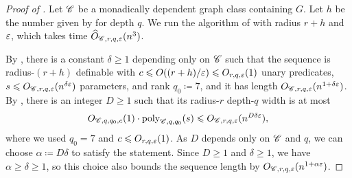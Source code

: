 \begin{proof}[Proof of ]
  Let $\mathscr C$ be a monadically dependent graph class containing $G$.
  Let $h$ be the number given by  for depth $q$.
  We run the algorithm of  with radius $r+h$ and $\varepsilon$, which takes time $\widehat O_{\mathscr C,r,q,\varepsilon}(n^3)$.
  
  By , there is a constant $\delta\ge1$ depending only on $\mathscr C$ such that the sequence is radius-$(r+h)$ definable with $c\leqslant O((r+h)/\varepsilon)\leqslant O_{r,q,\varepsilon}(1)$ unary predicates, $s\leqslant O_{\mathscr C,r,q,\varepsilon}(n^{\delta\varepsilon})$ parameters, and rank $q_0\coloneqq7$,
  and it has length $O_{\mathscr C,r,q,\varepsilon}(n^{1+\delta\varepsilon})$.
  By , there is an integer $D\ge1$ such that its radius-$r$ depth-$q$ width is at most
  \[
    O_{\mathscr C,q,q_0,c}(1)\cdot\mathrm{poly}_{\mathscr C,q,q_0}(s)\leqslant O_{\mathscr C,r,q,\varepsilon}(n^{D\delta\varepsilon}),
  \]
  where we used $q_0=7$ and $c\leqslant O_{r,q,\varepsilon}(1)$. As $D$ depends only on $\mathscr C$ and $q$, we can choose $\alpha\coloneqq D\delta$ to satisfy the statement.
  Since $D\ge1$ and $\delta\ge1$, we have $\alpha\ge \delta\ge1$, so this choice also bounds the sequence length by $O_{\mathscr C,r,q,\varepsilon}(n^{1+\alpha\varepsilon})$.
\end{proof}
